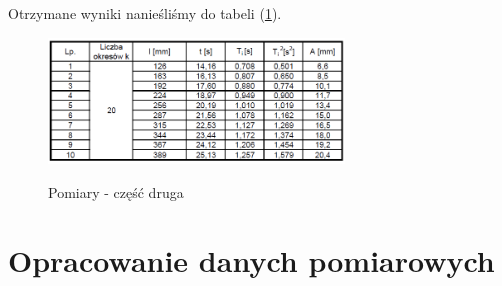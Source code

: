 \documentclass [a4paper,11pt]{article}
\begin{document}
\begin{itemize}
		Otrzymane wyniki nanieśliśmy do tabeli (\ref{fig:czescdruga}).
		
		\begin{figure}[!h]
			\centering
			\caption{Pomiary - część druga}
			\includegraphics[width=0.7\textwidth]{tab2}
			\label{fig:czescdruga}
		\end{figure}
	\newpage
	\end{itemize}
	
	\section{Opracowanie danych pomiarowych}
\end{document}

